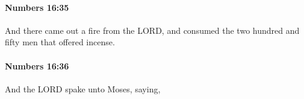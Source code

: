 		\paragraph{Numbers 16:35} %
			\label{NUMBERS-16-35}

			And there came out a fire from the LORD, and consumed the two hundred and fifty men that offered incense.


		\paragraph{Numbers 16:36} %
			\label{NUMBERS-16-36}

			And the LORD spake unto Moses, saying,


